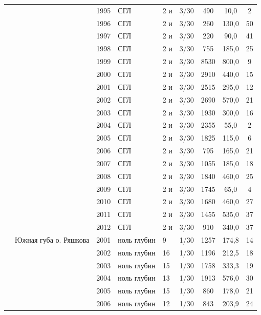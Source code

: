 \documentclass[12pt, a4paper]{disser}
\begin{document}
\begin{footnotesize}
\begin{longtable}{|p{2cm}|p{3cm}|p{1cm}|p{2cm}|p{1.5cm}|p{1cm}|*{3}{c|}}
		 &  & 1995 & СГЛ & 2 и & 3/30 & 490 & 10,0 & 2
		\\ \cline{3-9}
		 &  & 1996 & СГЛ & 2 и & 3/30 & 260 & 130,0 & 50
		\\ \cline{3-9}
		 &  & 1997 & СГЛ & 2 и & 3/30 & 220 & 90,0 & 41
		\\ \cline{3-9}
		 &  & 1998 & СГЛ & 2 и & 3/30 & 755 & 185,0 & 25
		\\ \cline{3-9}
		 &  & 1999 & СГЛ & 2 и & 3/30 & 8530 & 800,0 & 9
		\\ \cline{3-9}
		 &  & 2000 & СГЛ & 2 и & 3/30 & 2910 & 440,0 & 15
		\\ \cline{3-9}
		 &  & 2001 & СГЛ & 2 и & 3/30 & 2515 & 295,0 & 12
		\\ \cline{3-9}
		 &  & 2002 & СГЛ & 2 и & 3/30 & 2690 & 570,0 & 21
		\\ \cline{3-9}
		 &  & 2003 & СГЛ & 2 и & 3/30 & 1930 & 300,0 & 16
		\\ \cline{3-9}
		 &  & 2004 & СГЛ & 2 и & 3/30 & 2355 & 55,0 & 2
		\\ \cline{3-9}
		 &  & 2005 & СГЛ & 2 и & 3/30 & 1825 & 115,0 & 6
		\\ \cline{3-9}
		 &  & 2006 & СГЛ & 2 и & 3/30 & 795 & 165,0 & 21
		\\ \cline{3-9}
		 &  & 2007 & СГЛ & 2 и & 3/30 & 1055 & 185,0 & 18
		\\ \cline{3-9}
		 &  & 2008 & СГЛ & 2 и & 3/30 & 1840 & 460,0 & 25
		\\ \cline{3-9}
		 &  & 2009 & СГЛ & 2 и & 3/30 & 1745 & 65,0 & 4
		\\ \cline{3-9}
		 &  & 2010 & СГЛ & 2 и & 3/30 & 1680 & 460,0 & 27
		\\ \cline{3-9}
		 &  & 2011 & СГЛ & 2 и & 3/30 & 1455 & 535,0 & 37
		\\ \cline{3-9}
		 &  & 2012 & СГЛ & 2 и & 3/30 & 910 & 340,0 & 37
		\\ \cline{2-9}
	 & Южная губа о. Ряшкова & 2001 & ноль глубин & 9 & 1/30 & 1257 & 174,8 & 14
		\\ \cline{3-9}
		 &  & 2002 & ноль глубин & 16 & 1/30 & 1196 & 212,5 & 18
		\\ \cline{3-9}
		 &  & 2003 & ноль глубин & 15 & 1/30 & 1758 & 333,3 & 19
		\\ \cline{3-9}
		 &  & 2004 & ноль глубин & 13 & 1/30 & 1913 & 576,0 & 30
		\\ \cline{3-9}
		 &  & 2005 & ноль глубин & 15 & 1/30 & 860 & 178,0 & 21
		\\ \cline{3-9}
		 &  & 2006 & ноль глубин & 12 & 1/30 & 843 & 203,9 & 24

\end{longtable}
\end{footnotesize}
\end{document}
